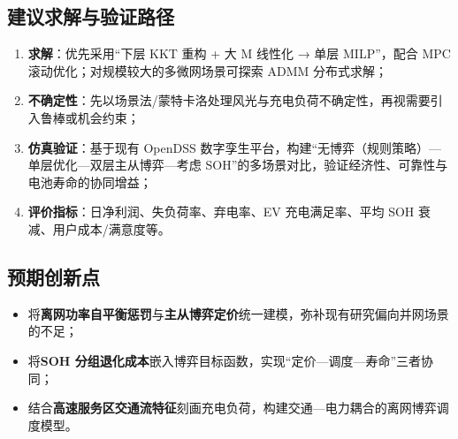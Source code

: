 \documentclass[UTF8,a4paper,11pt]{ctexart}
\begin{document}
\subsection{建议求解与验证路径}
\begin{enumerate}
  \item \textbf{求解}：优先采用“下层 KKT 重构 + 大 M 线性化 → 单层 MILP”，配合 MPC 滚动优化；对规模较大的多微网场景可探索 ADMM 分布式求解；
  \item \textbf{不确定性}：先以场景法/蒙特卡洛处理风光与充电负荷不确定性，再视需要引入鲁棒或机会约束；
  \item \textbf{仿真验证}：基于现有 OpenDSS 数字孪生平台，构建“无博弈（规则策略）—单层优化—双层主从博弈—考虑 SOH”的多场景对比，验证经济性、可靠性与电池寿命的协同增益；
  \item \textbf{评价指标}：日净利润、失负荷率、弃电率、EV 充电满足率、平均 SOH 衰减、用户成本/满意度等。
\end{enumerate}

\subsection{预期创新点}
\begin{itemize}
  \item 将\textbf{离网功率自平衡惩罚}与\textbf{主从博弈定价}统一建模，弥补现有研究偏向并网场景的不足；
  \item 将\textbf{SOH 分组退化成本}嵌入博弈目标函数，实现“定价—调度—寿命”三者协同；
  \item 结合\textbf{高速服务区交通流特征}刻画充电负荷，构建交通—电力耦合的离网博弈调度模型。
\end{itemize}
\end{document}
